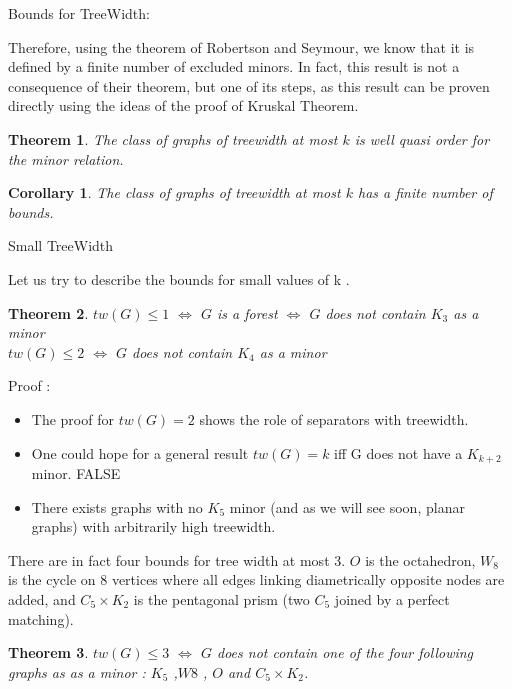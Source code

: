 \documentclass[12pt,a4paper]{article}
\newtheorem{theorem}{Theorem}
\newtheorem{corollary}{Corollary}
\begin{document}
Bounds for TreeWidth:

Therefore, using the theorem of Robertson and Seymour, we know that it is
defined by a finite number of excluded minors. In fact, this result is not a
consequence of their theorem, but one of its steps, as this result can be proven
directly using the ideas of the proof of Kruskal Theorem.

\begin{theorem}
The class of graphs of treewidth at most $k$ is well quasi order for the minor relation.
\end{theorem}

\begin{corollary}
The class of graphs of treewidth at most $k$ has a finite number of bounds.
\end{corollary}

Small TreeWidth

Let us try to describe the bounds for small values of k .

\begin{theorem}
$tw( G ) \leq 1$ $\Leftrightarrow$ $G$ is a forest $\Leftrightarrow$ $G$ does not contain $K_3$ as a minor\\
$tw( G ) \leq 2$ $\Leftrightarrow$ $G$ does not contain $K_4$ as a minor\\
\end{theorem}

Proof :
\begin{itemize}
\item The proof for $tw( G ) = 2$ shows the role of separators with treewidth.
\item One could hope for a general result $tw( G ) = k$ iff G does not have a $K_{k + 2}$
minor. FALSE
\item There exists graphs with no $K_5$ minor (and as we will see soon, planar graphs)
with arbitrarily high treewidth.
\end{itemize}

There are in fact four bounds for tree width at most 3. $O$ is the octahedron, $W_8$ is
the cycle on 8 vertices where all edges linking diametrically opposite nodes are
added, and $C_5 \times K_2$ is the pentagonal prism (two $C_5$ joined by a perfect matching).

\begin{theorem}
$tw( G ) \leq 3$ $\Leftrightarrow$ $G$ does not contain one of the four following graphs as as a minor :
$K_5$ ,$W 8$ , $O$ and $C_5 \times K_2$.
\end{theorem}
\end{document}
